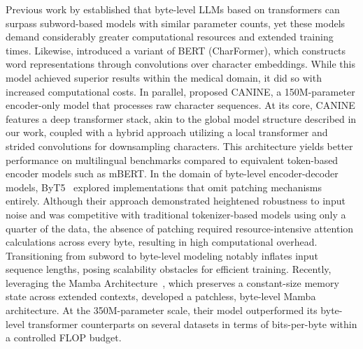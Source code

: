 Previous work by \cite{Choe2019BridgingTG} established that byte-level LLMs based on transformers can surpass subword-based models with similar parameter counts, yet these models demand considerably greater computational resources and extended training times. Likewise, \cite{el2020characterbert} introduced a variant of BERT (CharFormer), which constructs word representations through convolutions over character embeddings. While this model achieved superior results within the medical domain, it did so with increased computational costs. In parallel, \cite{clark2022canine} proposed CANINE, a 150M-parameter encoder-only model that processes raw character sequences. At its core, CANINE features a deep transformer stack, akin to the global model structure described in our work, coupled with a hybrid approach utilizing a local transformer and strided convolutions for downsampling characters. This architecture yields better performance on multilingual benchmarks compared to equivalent token-based encoder models such as mBERT. In the domain of byte-level encoder-decoder models, ByT5~\citep{xue2022byt5} explored implementations that omit patching mechanisms entirely. Although their approach demonstrated heightened robustness to input noise and was competitive with traditional tokenizer-based models using only a quarter of the data, the absence of patching required resource-intensive attention calculations across every byte, resulting in high computational overhead. Transitioning from subword to byte-level modeling notably inflates input sequence lengths, posing scalability obstacles for efficient training. Recently, leveraging the Mamba Architecture~\citep{gu2023mamba}, which preserves a constant-size memory state across extended contexts, \cite{wang2024mambabyte} developed a patchless, byte-level Mamba architecture. At the 350M-parameter scale, their model outperformed its byte-level transformer counterparts on several datasets in terms of bits-per-byte within a controlled FLOP budget.

